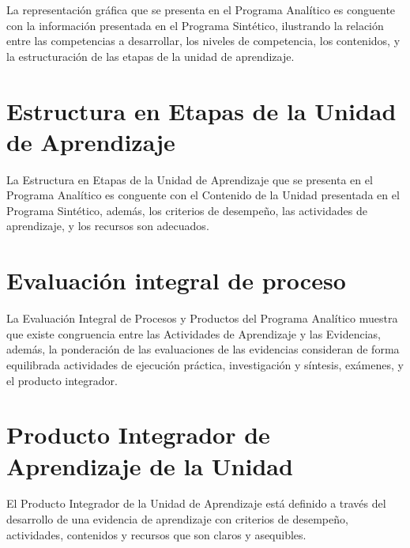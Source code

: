 \documentclass{article}
\begin{document}
\begin{Form}
La representaci\'{o}n gr\'{a}fica que se presenta en el Programa Anal\'{i}tico es conguente con la
informaci\'{o}n presentada en el Programa Sint\'{e}tico, ilustrando la relaci\'{o}n entre las
competencias a desarrollar, los niveles de competencia, los contenidos, y la estructuraci\'{o}n
de las etapas de la unidad de aprendizaje.   \hfill {}%
  \quad%

\newpage

\section{Estructura en Etapas de la Unidad de Aprendizaje}

La Estructura en Etapas de la Unidad de Aprendizaje que se presenta en el Programa
Anal\'{i}tico es conguente con el Contenido de la Unidad presentada en el Programa Sint\'{e}tico,
adem\'{a}s, los criterios de desempe\~{n}o, las actividades de aprendizaje, y los recursos son
adecuados.   \hfill {}%
  \quad%

\section{Evaluaci\'{o}n integral de proceso}

La Evaluaci\'{o}n Integral de Procesos y Productos del Programa Anal\'{i}tico muestra que existe
congruencia entre las Actividades de Aprendizaje y las Evidencias, adem\'{a}s, la ponderaci\'{o}n
de las evaluaciones de las evidencias consideran de forma equilibrada actividades de
ejecuci\'{o}n pr\'{a}ctica, investigaci\'{o}n y s\'{i}ntesis, ex\'{a}menes, y el producto integrador.   \hfill {}%
  \quad%

\section{Producto Integrador de Aprendizaje de la Unidad}

El Producto Integrador de la Unidad de Aprendizaje est\'{a} definido a trav\'{e}s del desarrollo de
una evidencia de aprendizaje con criterios de desempe\~{n}o, actividades, contenidos y
recursos que son claros y asequibles.   \hfill {}%
  \quad%


\end{Form}
\end{document}
